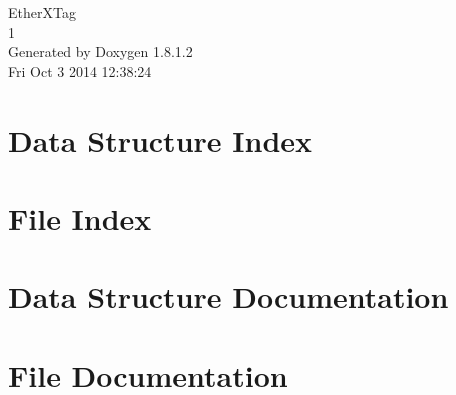 \documentclass{book}
\begin{document}
\hypersetup{pageanchor=false,citecolor=blue}
\begin{titlepage}
\vspace*{7cm}
\begin{center}
{\Large Ether\-X\-Tag \\[1ex]\large 1 }\\
\vspace*{1cm}
{\large Generated by Doxygen 1.8.1.2}\\
\vspace*{0.5cm}
{\small Fri Oct 3 2014 12:38:24}\\
\end{center}
\end{titlepage}
\clearemptydoublepage
{}
\tableofcontents
\clearemptydoublepage
{}
\hypersetup{pageanchor=true,citecolor=blue}
\chapter{Data Structure Index}

\chapter{File Index}

\chapter{Data Structure Documentation}



































\chapter{File Documentation}














\printindex
\end{document}
